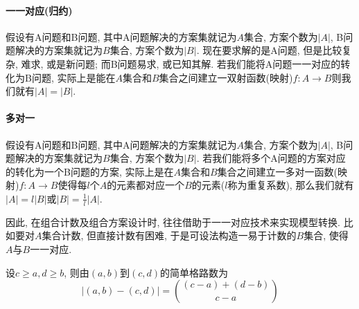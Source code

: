     \paragraph{一一对应(归约)}

        假设有A问题和B问题, 其中A问题解决的方案集就记为$A$集合, 方案个数为$|A|$,  B问题解决的方案集就记为$B$集合, 方案个数为$|B|$. 现在要求解的是A问题, 但是比较复杂, 难求, 或是新问题; 而B问题易求, 或已知其解. 若我们能将A问题一一对应的转化为B问题, 实际上是能在$A$集合和$B$集合之间建立一双射函数(映射)$f:A\to B$则我们就有$|A|=|B|$. 

    \paragraph{多对一}

        假设有A问题和B问题, 其中A问题解决的方案集就记为$A$集合, 方案个数为$|A|$,  B问题解决的方案集就记为$B$集合, 方案个数为$|B|$. 若我们能将多个A问题的方案对应的转化为一个B问题的方案, 实际上是在$A$集合和$B$集合之间建立一\textsf{多对一函数}(映射)$f:A\to B$使得每$l$个$A$的元素都对应一个$B$的元素($l$称为\textsf{重复系数}), 那么我们就有$|A|=l|B|$或$|B|=\frac{1}{l}|A|$.

    因此, 在组合计数及组合方案设计时, 往往借助于一一对应技术来实现模型转换. 比如要对$A$集合计数, 但直接计数有困难, 于是可设法构造一易于计数的$B$集合, 使得$A$与$B$一一对应. 

    \begin{theorem}[格路定理]\rm
        设$c\geqslant a, d\geqslant b$, 则由$(a,b)$到$(c,d)$的\textsf{简单格路数}为
        \[\left|(a,b)-(c,d)\right|={(c-a)+(d-b)\choose c-a}\]
    \end{theorem}

